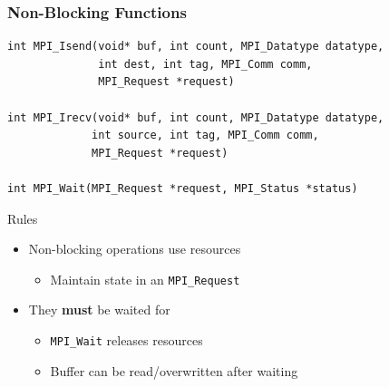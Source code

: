 \documentclass[xcolor={x11names,svgnames,psnames}]{beamer}
\begin{document}
\begin{frame}[fragile=singleslide]
  \frametitle{Non-Blocking Functions}

\begin{verbatim}
int MPI_Isend(void* buf, int count, MPI_Datatype datatype,
              int dest, int tag, MPI_Comm comm,
              MPI_Request *request)

int MPI_Irecv(void* buf, int count, MPI_Datatype datatype,
             int source, int tag, MPI_Comm comm,
             MPI_Request *request)

int MPI_Wait(MPI_Request *request, MPI_Status *status)
\end{verbatim}

  \begin{block}{Rules}
    \begin{itemize}
    \item Non-blocking operations use resources
      \begin{itemize}
      \item Maintain state in an \texttt{MPI_Request}
      \end{itemize}
    \item They \textbf{must} be waited for
      \begin{itemize}
      \item \texttt{MPI_Wait} releases resources 
      \item Buffer can be read/overwritten after waiting
      \end{itemize}
    \end{itemize}
  \end{block}
\end{frame}


\end{document}
